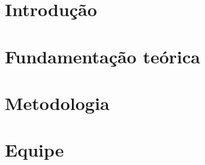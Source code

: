 \section{Introdução} %
\label{sec:introdu_o}
 

\section{Fundamentação teórica} %
\label{sec:fundamenta_o_te_rica}
 

\section{Metodologia} %
\label{sec:metodologia}
 

\section{Equipe} %
\label{sec:equipe}


%

%
